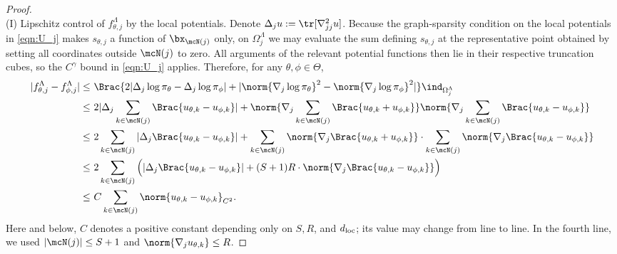 \documentclass[11pt]{article}
\begin{document}
\begin{proof}
\ \\[-5pt]
\noindent
(I) Lipschitz control of $f_{\theta,j}^\Lambda$ by the local potentials.
%
Denote $\Delta_j u := \tr [\nabla_{jj}^2 u] $.
Because the graph-sparsity condition on the local potentials in \eqref{eqn:U_j} makes $s_{\theta,j}$ a function of $\bx_{\mcN(j)}$ only, on $\Omega_j^\Lambda$ we may evaluate the sum defining $s_{\theta,j}$ at the representative point obtained by setting all coordinates outside $\mcN(j)$ to zero.
All arguments of the relevant potential functions then lie in their respective truncation cubes, so the $C^\gamma$ bound in \eqref{eqn:U_j} applies.
Therefore, for any $\theta,\phi \in \Theta$,
\begin{align*}
    | f_{\theta,j}^\Lambda - f_{\phi,j}^\Lambda| \le~& \Brac{2 | \Delta_j \log \pi_\theta - \Delta_j \log \pi_\phi | + | \norm{ \nabla_j \log \pi_\theta }^2 - \norm{ \nabla_j \log \pi_\phi }^2 |}\ind_{\Omega_j^\Lambda} \\
    \le~& 2 | \Delta_j \sum_{k\in \mcN(j)} \Brac{ u_{\theta,k} - u_{\phi,k} } | + \norm{ \nabla_j \sum_{k\in \mcN(j)} \Brac{ u_{\theta,k} + u_{\phi,k} } } \norm{ \nabla_j \sum_{k\in \mcN(j)} \Brac{ u_{\theta,k} - u_{\phi,k} } } \\
    \le~& 2 \sum_{k\in \mcN(j)} | \Delta_j \Brac{ u_{\theta,k} - u_{\phi,k} } | + \sum_{k\in \mcN(j)} \norm{ \nabla_j \Brac{ u_{\theta,k} + u_{\phi,k} } } \cdot \sum_{k\in \mcN(j)} \norm{ \nabla_j \Brac{ u_{\theta,k} - u_{\phi,k} } } \\
    \le~& 2 \sum_{k\in \mcN(j)} \Big( | \Delta_j \Brac{ u_{\theta,k} - u_{\phi,k} } | + (S + 1) R \cdot \norm{ \nabla_j \Brac{ u_{\theta,k} - u_{\phi,k} } }  \Big) \\
    \le~& C \sum_{k\in \mcN(j)} \norm{ u_{\theta,k} - u_{\phi,k} }_{C^2}.
\end{align*}
Here and below, $C$ denotes a positive constant depending only on $S,R$, and $d_{\rm loc}$; its value may change from line to line. In the fourth line, we used $|\mcN(j)| \le S + 1$ and $\norm{ \nabla_j u_{\theta,k} } \le R$.




\end{proof}
\end{document}
